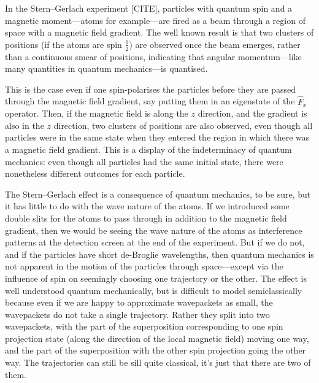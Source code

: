 In the Stern--Gerlach experiment [CITE], particles with quantum spin and a magnetic moment---atoms for example---are fired as a beam through a region of space with a magnetic field gradient. The well known result is that two clusters of positions (if the atoms are spin $\frac12$) are observed once the beam emerges, rather than a continuous smear of positions, indicating that angular momentum---like many quantities in quantum mechanics---is quantised.

This is the case even if one spin-polarises the particles before they are passed through the magnetic field gradient, say putting them in an eigenstate of the $\hat F_x$ operator. Then, if the magnetic field is along the $z$ direction, and the gradient is also in the $z$ direction, two clusters of positions are also observed, even though all particles were in the same state when they entered the region in which there was a magnetic field gradient. This is a display of the indeterminacy of quantum mechanics: even though all particles had the same initial state, there were nonetheless different outcomes for each particle.

The Stern--Gerlach effect is a consequence of quantum mechanics, to be sure, but it has little to do with the wave nature of the atoms. If we introduced some double slits for the atoms to pass through in addition to the magnetic field gradient, then we would be seeing the wave nature of the atoms as interference patterns at the detection screen at the end of the experiment. But if we do not, and if the particles have short de-Broglie wavelengths, then quantum mechanics is not apparent in the motion of the particles through space---except via the influence of spin on seemingly choosing one trajectory or the other. The effect is well understood quantum mechanically, but is difficult to model semiclassically because even if we are happy to approximate wavepackets as small, the wavepackets do not take a single trajectory. Rather they split into two wavepackets, with the part of the superposition corresponding to one spin projection state (along the direction of the local magnetic field) moving one way, and the part of the superposition with the other spin projection going the other way. The trajectories can still be sill quite classical, it's just that there are two of them.

